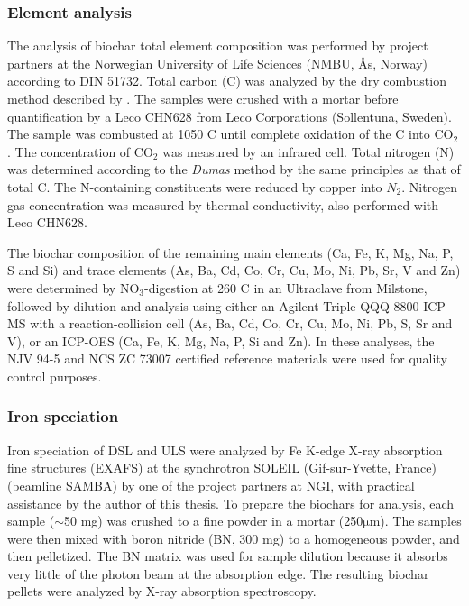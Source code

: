 \subsubsection{Element analysis}
The analysis of biochar total element composition was performed by project partners at the Norwegian University of Life Sciences (NMBU, Ås, Norway) according to DIN 51732. Total carbon (C) was analyzed by the dry combustion method described by \cite{nelson1983total}. The samples were crushed with a mortar before quantification by a Leco CHN628 from Leco Corporations (Sollentuna, Sweden). The sample was combusted at 1050 \textdegree C until complete oxidation of the C into $\mathrm{CO_2}$. The concentration of $\mathrm{CO_2}$ was measured by an infrared cell. Total nitrogen (N) was determined according to the \textit{Dumas} method \citep{Dumas1983total} by the same principles as that of total C. The N-containing constituents were reduced by copper into $N_2$. Nitrogen gas concentration was measured by thermal conductivity, also performed with Leco CHN628. 

The biochar composition of the remaining main elements (Ca, Fe, K, Mg, Na, P, S and Si) and trace elements (As, Ba, Cd, Co, Cr, Cu, Mo, Ni, Pb, Sr, V and Zn) were determined by $\mathrm{NO_3}$-digestion at 260 \textdegree C in an Ultraclave from Milstone, followed by dilution and analysis using either an Agilent Triple QQQ 8800 ICP-MS with a reaction-collision cell (As, Ba, Cd, Co, Cr, Cu, Mo, Ni, Pb, S, Sr and V), or an ICP-OES (Ca, Fe, K, Mg, Na, P, Si and Zn). In these analyses, the NJV 94-5 and NCS ZC 73007 certified reference materials were used for quality control purposes.

\subsubsection{Iron speciation}
Iron speciation of DSL and ULS were analyzed by Fe K-edge X-ray absorption fine structures (EXAFS) at the synchrotron SOLEIL (Gif-sur-Yvette, France) (beamline SAMBA) by one of the project partners at NGI, with practical assistance by the author of this thesis. To prepare the biochars for analysis, each sample ($\sim$50 mg) was crushed to a fine powder in a mortar (250$\mathrm{\mu m}$). The samples were then mixed with boron nitride (BN, 300 mg) to a homogeneous powder, and then pelletized. The BN matrix was used for sample dilution because it absorbs very little of the photon beam at the absorption edge. The resulting biochar pellets were analyzed by X-ray absorption spectroscopy.


